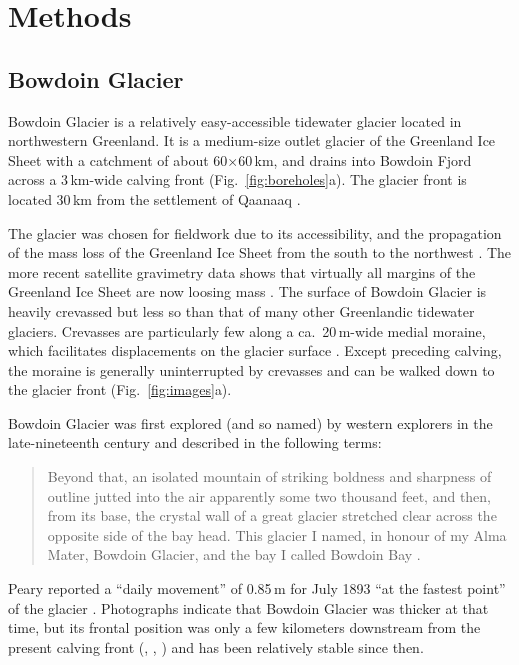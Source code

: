 \documentclass[utf8]{article}
\begin{document}
\section{Methods}

\subsection{Bowdoin Glacier}

    Bowdoin Glacier is a relatively easy-accessible tidewater glacier located
    in northwestern Greenland. It is a medium-size outlet glacier of the Greenland
    Ice Sheet with a catchment of about 60$\times$60\,km, and drains into
    Bowdoin Fjord across a 3\,km-wide calving front
    (Fig.~\ref{fig:boreholes}a). The glacier front is located 30\,km from the
    settlement of Qaanaaq \citep[Fig.~1]{Sugiyama.etal.2015}.

    The glacier was chosen for fieldwork due to its accessibility, and the
    propagation of the mass loss of the Greenland Ice Sheet from the south to
    the northwest \citep{Khan.etal.2010}. The more recent satellite gravimetry
    data shows that virtually all margins of the Greenland Ice Sheet are now
    loosing mass \citep{Groh.Horwath.2016}. The surface of Bowdoin Glacier
    is heavily crevassed but less so than that of many other Greenlandic
    tidewater glaciers. Crevasses are particularly few along a ca.~20\,m-wide
    medial moraine, which facilitates
    displacements on the glacier surface \citep[Figs.~68]{Chamberlin.1897}.
    Except preceding calving, the moraine is generally uninterrupted by
    crevasses and can be walked down to the glacier front
    (Fig.~\ref{fig:images}a).

    Bowdoin Glacier was first explored (and so named) by western explorers in
    the late-nineteenth century and described in the following terms:
    \begin{quote}
        Beyond that, an isolated mountain of striking boldness and sharpness of
        outline jutted into the air apparently some two thousand feet, and
        then, from its base, the crystal wall of a great glacier stretched
        clear across the opposite side of the bay head. This glacier I named,
        in honour of my Alma Mater, Bowdoin Glacier, and the bay I called
        Bowdoin Bay \citep[p.~393--394]{Peary.1898}.
    \end{quote}
    Peary reported a ``daily movement'' of 0.85\,m for July 1893 ``at the
    fastest point'' of the glacier \citep{Chamberlin.1894}.
    Photographs indicate that Bowdoin Glacier was thicker at that time, but its
    frontal position was only a few kilometers downstream from the present
    calving front (\citealp[p.~668]{Chamberlin.1895}, \citealp[Figs.~64
    and~65]{Chamberlin.1897}, \citealp[Fig.~1]{Podolskiy.etal.2016}) and has
    been relatively stable since then.
\end{document}
